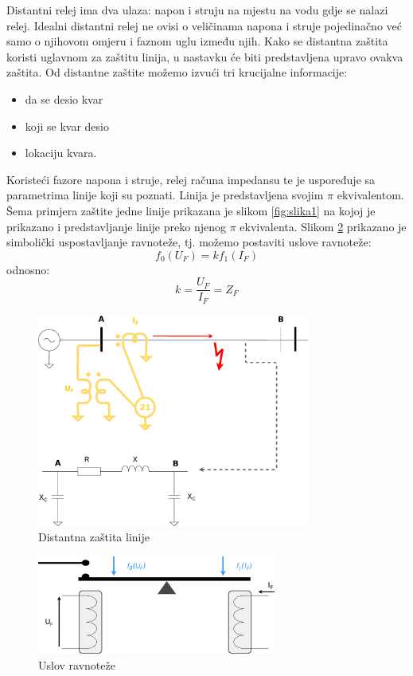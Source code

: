 Distantni relej ima dva ulaza: napon i struju na mjestu na vodu gdje se nalazi relej. Idealni distantni relej ne ovisi o veličinama napona i struje pojedinačno već samo o njihovom omjeru i faznom uglu između njih. \cite{druga} Kako se distantna zaštita koristi uglavnom za zaštitu linija, u nastavku će biti predstavljena upravo ovakva zaštita. \cite{prva} Od distantne zaštite možemo izvući tri krucijalne informacije:

\begin{itemize}
    \item da se desio kvar
    \item koji se kvar desio
    \item lokaciju kvara.
\end{itemize}

Koristeći fazore napona i struje, relej računa impedansu te je uspoređuje sa parametrima linije koji su poznati. Linija je predstavljena svojim $\pi$ ekvivalentom. Šema primjera zaštite jedne linije prikazana je slikom \ref{fig:slika1} na kojoj je prikazano i predstavljanje linije preko njenog $\pi$ ekvivalenta. Slikom \ref{fig:shema2} prikazano je simbolički uspostavljanje ravnoteže, tj. možemo postaviti uslove ravnoteže:
 \[ f_0(U_F)=kf_1(I_F)\]
odnosno:
\[k=\frac{U_F}{I_F}=Z_F\]


\begin{figure}[H]
  \centering
  \includegraphics[width=0.8\textwidth]{shema1}
  \caption{Distantna zaštita linije}
  \label{fig:shema1}
\end{figure}

\begin{figure}[H]
  \centering
  \includegraphics[width=0.7\textwidth]{shema2}
  \caption{Uslov ravnoteže}
  \label{fig:shema2}
\end{figure}

